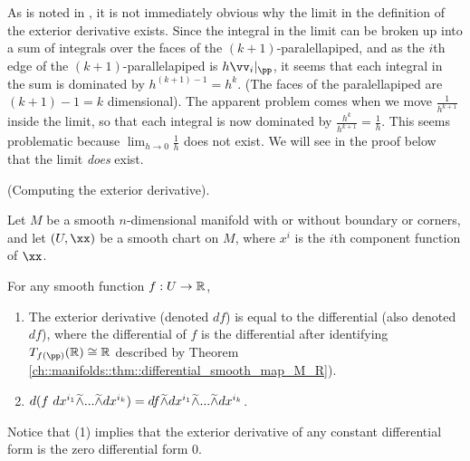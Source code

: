 \begin{defn}
    As is noted in \cite[p. 545]{book::Hubbard}, it is not immediately obvious why the limit in the definition of the exterior derivative exists. Since the integral in the limit can be broken up into a sum of integrals over the faces of the $(k + 1)$-paralellapiped, and as the $i$th edge of the $(k + 1)$-parallelapiped is $h\vv_i|_\pp$, it seems that each integral in the sum is dominated by $h^{(k + 1) - 1} = h^k$. (The faces of the paralellapiped are $(k + 1) - 1 = k$ dimensional). The apparent problem comes when we move $\frac{1}{h^{k + 1}}$ inside the limit, so that each integral is now dominated by $\frac{h^k}{h^{k + 1}} = \frac{1}{h}$. This seems problematic because $\lim_{h \rightarrow 0} \frac{1}{h}$ does not exist. We will see in the proof below that the limit \textit{does} exist.
\end{defn}

\begin{theorem}
    \label{ch::diff_forms::thm::computing_exterior_deriv}
     (Computing the exterior derivative).
    
    Let $M$ be a smooth $n$-dimensional manifold with or without boundary or corners, and let $(U, \xx)$ be a smooth chart on $M$, where $x^i$ is the $i$th component function of $\xx$. 
    
    For any smooth function $f:U \rightarrow \mathbb{R}$,
    
    \begin{enumerate}
        \item The exterior derivative (denoted $df$) is equal to the differential (also denoted $df$), where the differential of $f$ is the differential after identifying $T_{f(\pp)}(\R) \cong \R$ described by Theorem \ref{ch::manifolds::thm::differential_smooth_map_M_R}).
        \item $d(f \text{ } dx^{i_1} \widetilde{\wedge} ... \widetilde{\wedge} dx^{i_k}) = df \widetilde{\wedge} dx^{i_1} \widetilde{\wedge} ... \widetilde{\wedge} dx^{i_k}$.
    \end{enumerate}
    
    Notice that (1) implies that the exterior derivative of any constant differential form is the zero differential form $0$.
\end{theorem}

